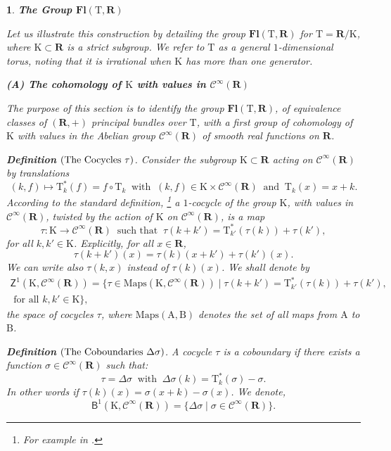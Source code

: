 \documentclass[10pt,letterpaper,reqno]{amsart}
\theoremstyle{article}
\newtheorem{article}[subsection]{}
\def\artlabel[#1]{{\textbf{#1}}}
\newenvironment{definition}[1][]{\textbf{Definition} $\left(\hbox{#1}\right)$.\it}{}
\newcommand{\1}{{\hat 1}}
\newcommand{\0}{{\hat 0}}
\newcommand{\RR}{\mathbf R}
\newcommand{\sfbZ}{{\boldsymbol{\mathsf Z}}}
\newcommand{\sfbB}{{\boldsymbol{\mathsf B}}}
\def \A{\mathrm A}
\def \B{\mathrm B}
\def \K{\mathrm K}
\def \T{\mathrm T}
\newcommand{\Cinfty}{\mathcal{C}^\infty}
\DeclareMathOperator{\Fb}{\boldsymbol{\mathsf{Fl}}}
\newcommand{\Ka}{\K}
\newcommand{\Maps}{\mathrm{Maps}}
\renewcommand{\Fb}{\mathbf{Fl}}
\begin{document}
  \begin{article}
    \artlabel[The Group $\Fb(\T, \RR)$]
    \label{The-Group-FbT}
    
    Let us illustrate this construction by detailing the group $\Fb(\T,\RR)$ for $\T = \RR/\Ka$,
    where $\Ka \subset \RR$ is a strict subgroup.
    We refer to $\T$ as a \emph{general $1$-dimensional torus}, noting that it is irrational when $\Ka$ has more than one generator.
    
    \textbf{(A) The cohomology of $\Ka$ with values in $\Cinfty(\RR)$}
    
    The purpose of this section is to identify the group $\Fb(\T,\RR)$,
    of equivalence classes of $(\RR,+)$ principal bundles over $\T$,
    with a first group of cohomology of $\Ka$ with values in the Abelian group $\Cinfty(\RR)$ of smooth real functions on $\RR$.
    
    \begin{definition}[The Cocycles $\tau$]
      Consider the subgroup $\Ka \subset \RR$ acting on $\Cinfty(\RR)$ by translations
      $$
        (k,f) \mapsto \T_k^*(f) = f \circ \T_k
        \ \text{ with } \
        (k,f) \in \Ka \times \Cinfty(\RR)
        \ \text{ and } \
        \T_k(x) = x + k.
        $$
      According to the standard definition,%
      \footnote{For example in \cite{Kir74}.}
      a $1$-cocycle of the group $\Ka$,
      with values in $\Cinfty(\RR)$,
      twisted by the action of $\Ka$ on $\Cinfty(\RR)$,
      is a map
      $$
        \tau : \Ka \to \Cinfty(\RR)
        \ \text{ such that } \
        \tau(k + k') = \T_{k'}^*(\tau(k)) + \tau(k'),
        $$
      for all $k,k' \in \Ka$.
      Explicitly,
      for all $x \in \RR$,
      $$
        \tau(k+k')(x) = \tau(k)(x+k') + \tau(k')(x).
        $$
      We can write also $\tau(k,x)$ instead of $\tau(k)(x)$.
      We shall denote by
      \begin{multline*}
        \sfbZ^1(\Ka,\Cinfty(\RR)) = \{ \tau \in \Maps(\Ka,\Cinfty(\RR)) \mid \tau(k + k') = \T_{k'}^*(\tau(k)) + \tau(k'), \\
        \text{ for all } k,k' \in \Ka \},
      \end{multline*}
      the space of cocycles $\tau$,
      where $\Maps(\A,\B)$ denotes the set of all maps from $\A$ to $\B$.
    \end{definition}
    
    \begin{definition}[The Coboundaries $\Delta\sigma$]
      A cocycle $\tau$ is a coboundary if there exists a function $\sigma \in \Cinfty(\RR)$ such that:
      $$
        \tau = \Delta\sigma
        \ \text{ with } \
        \Delta\sigma(k) = \T_k^*(\sigma) - \sigma.
        $$
      In other words if
      $\tau(k)(x) = \sigma(x+k) - \sigma(x)$.
      We denote,
      $$
        \sfbB^1(\Ka,\Cinfty(\RR)) = \{ \Delta\sigma \mid \sigma \in \Cinfty(\RR) \}.
        $$
    \end{definition}
    

\end{article}
\end{document}
